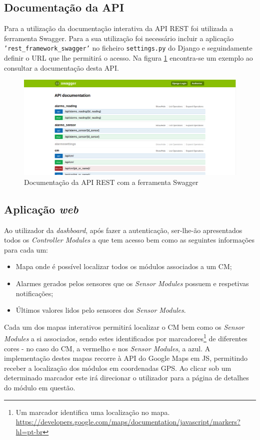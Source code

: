\subsection{Documentação da API}

Para a utilização da documentação interativa da API REST foi utilizada a ferramenta Swagger. Para a sua utilização foi necessário incluir a aplicação \texttt{'rest\_framework\_swagger'} no ficheiro \texttt{settings.py} do Django e seguindamente definir o \ac{URL} que lhe permitirá o acesso. Na figura \ref{docapi} encontra-se um exemplo ao consultar a documentação desta API. 

\newpage

\begin{figure}[h]
	\centering
	\includegraphics[width=0.71\linewidth]{prints-web/api-doc.png}
	\caption{Documentação da API REST com a ferramenta Swagger}
	\label{docapi}
\end{figure}


\subsection{Aplicação \textit{web}}

Ao utilizador da \textit{dashboard}, após fazer a autenticação, ser-lhe-ão apresentados todos os \textit{Controller Modules} a que tem acesso bem como as seguintes informações para cada um:


\begin{itemize}
	\item Mapa onde é possível localizar todos os módulos associados a um \acl{CM}; 
	
	\item Alarmes gerados pelos sensores que os \textit{Sensor Modules} possuem e respetivas notificações; 
	
	\item Últimos valores lidos pelo sensores dos \textit{Sensor Modules}.
\end{itemize} 



Cada um dos mapas interativos permitirá localizar o \acl{CM} bem como os \textit{Sensor Modules} a si associados, sendo estes identificados por marcadores\footnote{Um marcador identifica uma localização no mapa. \\ \url{https://developers.google.com/maps/documentation/javascript/markers?hl=pt-br}} de diferentes cores - no caso do \acl{CM}, a vermelho e nos \textit{Sensor Modules}, a azul. A implementação destes mapas recorre à \ac{API} do Google Maps em \ac{JS}, permitindo receber a localização dos módulos em coordenadas \ac{GPS}. Ao clicar sob um determinado marcador este irá direcionar o utilizador para a página de detalhes do módulo em questão. 


